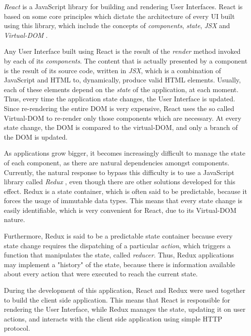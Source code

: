 \textit{React} \cite{react} is a JavaScript library for building and rendering User Interfaces.
React is based on some core principles which dictate the architecture of every UI built using this library,
which include the concepts of \textit{components}, \textit{state}, \textit{JSX} and \textit{Virtual-DOM} \cite{react_redux_article}.

Any User Interface built using React is the result of the \textit{render} method invoked by each of its \textit{components}.
The content that is actually presented by a component is the result of its source code, written in \textit{JSX},
which is a combination of JavaScript and HTML to, dynamically, produce valid HTML elements.
Usually, each of these elements depend on the \textit{state} of the application, at each moment.
Thus, every time the application state changes, the User Interface is updated.
Since re-rendering the entire DOM is very expensive, React uses the so called Virtual-DOM
to re-render only those components which are necessary.
At every state change, the DOM is compared to the virtual-DOM,
and only a branch of the DOM is updated.

As applications grow bigger, it becomes increasingly difficult to manage the state of each component,
as there are natural dependencies amongst components. Currently, the natural response to bypass 
this difficulty is to use a JavaScript library called \textit{Redux} \cite{redux}, even though
there are other solutions developed for this effect.
Redux is a state container, which is often said to be predictable, because it forces 
the usage of immutable data types. This means that every state change is easily identifiable,
which is very convenient for React, due to its Virtual-DOM nature.

Furthermore, Redux is said to be a predictable state container because 
every state change requires the dispatching of a particular \textit{action}, which triggers a function 
that manipulates the state, called \textit{reducer}. Thus, Redux applications
may implement a "history" of the state, because there is information available about every action 
that were executed to reach the current state. 

During the development of this application, React and Redux were used together 
to build the client side application. This means that React is responsible
for rendering the User Interface, while Redux manages the state,
updating it on user actions, and interacts with the client side application
using simple HTTP protocol.

